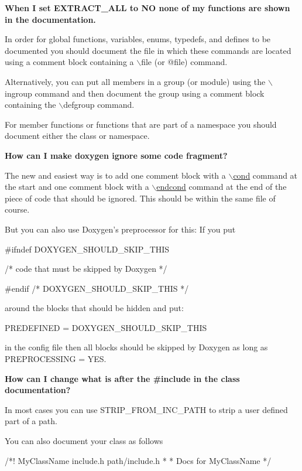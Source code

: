\begin{DoxyEnumerate}
\item {\bfseries When I set EXTRACT\_\-ALL to NO none of my functions are shown in the documentation.}

In order for global functions, variables, enums, typedefs, and defines to be documented you should document the file in which these commands are located using a comment block containing a $\backslash$file (or @file) command.

Alternatively, you can put all members in a group (or module) using the $\backslash$ingroup command and then document the group using a comment block containing the $\backslash$defgroup command.

For member functions or functions that are part of a namespace you should document either the class or namespace.


\item {\bfseries How can I make doxygen ignore some code fragment?}

The new and easiest way is to add one comment block with a \hyperlink{commands_cmdcond}{$\backslash$cond} command at the start and one comment block with a \hyperlink{commands_cmdendcond}{$\backslash$endcond} command at the end of the piece of code that should be ignored. This should be within the same file of course.

But you can also use Doxygen's preprocessor for this: If you put \begin{DoxyVerb}
#ifndef DOXYGEN_SHOULD_SKIP_THIS

 /* code that must be skipped by Doxygen */

#endif /* DOXYGEN_SHOULD_SKIP_THIS */
\end{DoxyVerb}
 around the blocks that should be hidden and put: \begin{DoxyVerb}
  PREDEFINED = DOXYGEN_SHOULD_SKIP_THIS
\end{DoxyVerb}
 in the config file then all blocks should be skipped by Doxygen as long as {\ttfamily PREPROCESSING = YES}.


\item {\bfseries How can I change what is after the {\ttfamily \#include} in the class documentation?}

In most cases you can use STRIP\_\-FROM\_\-INC\_\-PATH to strip a user defined part of a path.

You can also document your class as follows

\begin{DoxyVerb}
/*! \class MyClassName include.h path/include.h
 *
 *  Docs for MyClassName
 */
\end{DoxyVerb}



\end{DoxyEnumerate}
